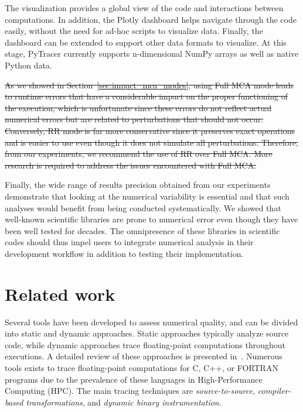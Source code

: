 \documentclass[10pt,journal,compsoc]{IEEEtran}
\newcommand{\pytracer}[0]{PyTracer\xspace}
\DeclareRobustCommand{\remove}[1]{\textcolor{lightred}{\sout{#1}}}
\begin{document}
The visualization provides a global view of the code and interactions between
computations. In addition, the Plotly dashboard helps navigate through the code
easily, without the need for ad-hoc scripts to visualize data. Finally, the
dashboard can be extended to support other data formats to visualize. At this
stage, \pytracer currently supports n-dimensional NumPy arrays as well as native
Python data. 

\remove{
    As we showed in Section~\ref{sec:impact_mca_modes}, using Full MCA mode leads to
    runtime errors that have a considerable impact on the proper functioning of the
    execution, which is unfortunate since these errors do not reflect actual
    numerical errors but are related to perturbations that should not occur.
    Conversely, RR mode is far more conservative since it preserves exact operations
    and is easier to use even though it does not simulate all perturbations.
    Therefore, from our experiments, we recommend the use of RR over Full MCA. More
    research is required to address the issues encountered with Full MCA. 
}


Finally, the wide range of results precision obtained from our experiments
demonstrate that looking at the numerical variability is essential and that such
analyses would benefit from being conducted systematically. We showed that
well-known scientific libraries are prone to numerical error even though they
have been well tested for decades. The omnipresence of these libraries in
scientific codes should thus impel users to integrate numerical analysis in
their development workflow in addition to testing their implementation.

\section{Related work}

Several tools have been developed to assess numerical quality, and can be
divided into static and dynamic approaches. Static approaches typically analyze
source code, while dynamic approaches trace floating-point computations
throughout executions. A detailed review of these approaches is presented
in~\cite{cherubin2020tools}. 
Numerous tools exists to trace floating-point computations for C, C++, or
FORTRAN programs due to the prevalence of these languages in High-Performance
Computing (HPC). The main tracing techniques are \textit{source-to-source},
\textit{compiler-based transformations}, and \textit{dynamic binary
    instrumentation}.
\end{document}
